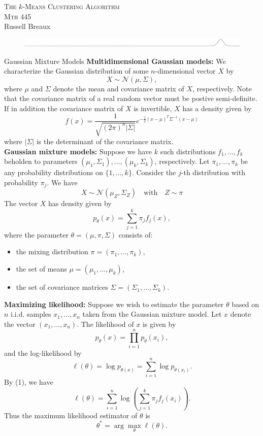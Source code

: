 \documentclass{article}
\begin{document}
\begin{center}
\LARGE \textsc{The $k$-Means Clustering Algorithm}\\
\Large \textsc{Mth 445}\\
\large Russell Breaux\\
\begin{figure}[h!]
 \centering
  \vspace{-0.5cm}
  \includegraphics[width=1.0\textwidth]{normal_nobackground1.png}
  \vspace{-1.0cm}
 \end{figure}
\end{center}
\begin{section} {Gaussian Mixture Models}
\textbf{Multidimensional Gaussian models:} We characterize the Gaussian distribution of some $n$-dimensional vector $X$ by 
\[X \sim  \mathcal{N}(\mu,\Sigma),\]
where  $\mu$ and $\Sigma$ denote the mean and covariance matrix of $X$, respectively. Note that the covariance matrix of a real random vector must be postive semi-definite. If in addition the covariance matrix of $X$ is invertible, $X$ has a density given by 
\[f(x) = \frac{1}{\sqrt{(2\pi)^{n}\lvert\Sigma\rvert}}e^{-\frac{1}{2}(x-\mu)^T\Sigma^{-1}(x-\mu)}\]
where $\lvert\Sigma\rvert$ is the determinant of the covariance matrix.\\

\textbf{Gaussian mixture models:} Suppose we have $k$ such distributions $f_1,\ldots,f_k$ beholden to parameters $(\mu_1,\Sigma_1),\ldots,(\mu_k,\Sigma_k)$, respectively. Let $\pi_1,\ldots,\pi_k$ be any probability distributions on $\{1,\ldots,k\}$. Consider the $j$-th distribution with probability $\pi_j$. We have
\[X \sim \mathcal{N}(\mu_Z,\Sigma_Z)\quad\text{with}\quad Z\sim\pi\]
The vector $X$ has density given by
\begin{equation}
p_\theta(x) = \sum_{j=1}^{k}{\pi_jf_j(x)},
\end{equation}
where the parameter $\theta = (\mu, \pi, \Sigma)$ consists of:
\begin{itemize}
	\item the mixing distribution $\pi = (\pi_1,\ldots,\pi_k)$,
	\item the set of means  $\mu = (\mu_1,\ldots,\mu_k)$,
	\item the set of covariance matrices $\Sigma = (\Sigma_1,\ldots,\Sigma_k)$.
\end{itemize}
\textbf{Maximizing likelihood:} Suppose we wish to estimate the parameter $\theta$ based on $n$ i.i.d. samples $x_1,\ldots,x_n$ taken from the Gaussian mixture model. Let $x$ denote the vector $(x_1,\ldots,x_n)$. The likelihood of $x$ is given by
\begin{equation}
p_\theta(x) = \prod_{i=1}^{n}{p_\theta(x_i)},
\end{equation}
and the log-likelihood by
\[\ell(\theta) = \log{p_{\theta(x)}} = \sum_{i=1}^{n}{\log{p_{\theta(x_i)}}}.\]
By (1), we have
\[\ell(\theta) = \sum_{i=1}^{n}{\log{\left(\sum_{j=1}^{k}{\pi_{j}f_{j}(x_i)}\right)}}.\]
Thus the maximum likelihood estimator of $\theta$ is
\[\theta^{*} = \arg\max_{\theta}{\ell(\theta)}.\]
\end{section}
\end{document}
